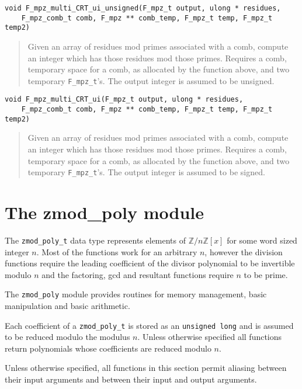 \documentclass[a4paper,10pt]{article}
\newcommand{\Z}{\mathbb{Z}}
\newcommand{\code}{\lstinline}
\begin{document}
\begin{lstlisting}
void F_mpz_multi_CRT_ui_unsigned(F_mpz_t output, ulong * residues, 
    F_mpz_comb_t comb, F_mpz ** comb_temp, F_mpz_t temp, F_mpz_t temp2)
\end{lstlisting}
\begin{quote}
Given an array of residues mod primes associated with a comb, compute an integer which has those residues mod those primes. Requires a comb, temporary space for a comb, as allocated by the function above, and two temporary \code{F_mpz_t}'s. The output integer is assumed to be unsigned.
\end{quote}

\begin{lstlisting}
void F_mpz_multi_CRT_ui(F_mpz_t output, ulong * residues, 
    F_mpz_comb_t comb, F_mpz ** comb_temp, F_mpz_t temp, F_mpz_t temp2)
\end{lstlisting}
\begin{quote}
Given an array of residues mod primes associated with a comb, compute an integer which has those residues mod those primes. Requires a comb, temporary space for a comb, as allocated by the function above, and two temporary \code{F_mpz_t}'s. The output integer is assumed to be signed.
\end{quote}

\section{The zmod\_poly module}

The \code{zmod_poly_t} data type represents elements of $\Z/n\Z[x]$ for some word sized integer $n$. Most of the functions work for an arbitrary $n$, however the division functions require the leading coefficient of the divisor polynomial to be invertible modulo $n$ and the factoring, gcd and resultant functions require $n$ to be prime.

The \code{zmod_poly} module provides routines for memory management, basic manipulation and basic arithmetic.

Each coefficient of a \code{zmod_poly_t} is stored as an \code{unsigned long} and is assumed to be reduced modulo the modulus $n$. Unless otherwise specified all functions return polynomials whose coefficients are reduced modulo $n$.

Unless otherwise specified, all functions in this section permit aliasing between their input arguments and between their input and output arguments. 
\end{document}
